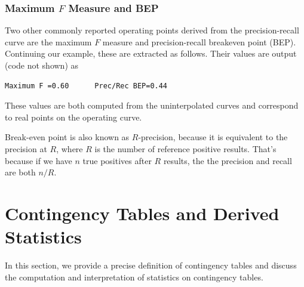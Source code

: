 \subsubsection{Maximum $F$ Measure and BEP}

Two other commonly reported operating points derived from the
precision-recall curve are the maximum $F$ measure and
precision-recall breakeven point (BEP).  Continuing our example,
these are extracted as follows.
%
%
Their values are output (code not shown) as 
\begin{verbatim}
Maximum F =0.60      Prec/Rec BEP=0.44
\end{verbatim}

These values are both computed from the uninterpolated curves and
correspond to real points on the operating curve.

Break-even point is also known as $R$-precision, because it is
equivalent to the precision at $R$, where $R$ is the number of
reference positive results.  That's because if we have $n$ true
positives after $R$ results, the the precision and recall are both
$n/R$.



\section{Contingency Tables and Derived Statistics}\label{section:classifier-eval-contingency-table}

In this section, we provide a precise definition of contingency tables
and discuss the computation and interpretation of statistics on
contingency tables.  

